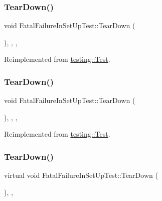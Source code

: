 \subsubsection{\texorpdfstring{TearDown()}{TearDown()}\hspace{0.1cm}{\footnotesize\ttfamily [1/3]}}
{\footnotesize\ttfamily void Fatal\+Failure\+In\+Set\+Up\+Test\+::\+Tear\+Down (\begin{DoxyParamCaption}{ }\end{DoxyParamCaption})\hspace{0.3cm}{\ttfamily [inline]}, {\ttfamily [override]}, {\ttfamily [protected]}, {\ttfamily [virtual]}}



Reimplemented from \mbox{\hyperlink{classtesting_1_1_test_a5f0ab439802cbe0ef7552f1a9f791923}{testing\+::\+Test}}.

\mbox{\label{class_fatal_failure_in_set_up_test_af5aeffabb2d3d92169b26a14883b4c26}} 
\subsubsection{\texorpdfstring{TearDown()}{TearDown()}\hspace{0.1cm}{\footnotesize\ttfamily [2/3]}}
{\footnotesize\ttfamily void Fatal\+Failure\+In\+Set\+Up\+Test\+::\+Tear\+Down (\begin{DoxyParamCaption}{ }\end{DoxyParamCaption})\hspace{0.3cm}{\ttfamily [inline]}, {\ttfamily [override]}, {\ttfamily [protected]}, {\ttfamily [virtual]}}



Reimplemented from \mbox{\hyperlink{classtesting_1_1_test_a5f0ab439802cbe0ef7552f1a9f791923}{testing\+::\+Test}}.

\mbox{\label{class_fatal_failure_in_set_up_test_a457707161063e08f7b6600ec5db449e4}} 
\subsubsection{\texorpdfstring{TearDown()}{TearDown()}\hspace{0.1cm}{\footnotesize\ttfamily [3/3]}}
{\footnotesize\ttfamily virtual void Fatal\+Failure\+In\+Set\+Up\+Test\+::\+Tear\+Down (\begin{DoxyParamCaption}{ }\end{DoxyParamCaption})\hspace{0.3cm}{\ttfamily [inline]}, {\ttfamily [protected]}, {\ttfamily [virtual]}}



